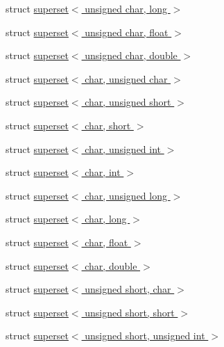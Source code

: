 \begin{DoxyCompactItemize}
\item 
struct \hyperlink{structcimg__library_1_1cimg_1_1superset_3_01unsigned_01char_00_01long_01_4}{superset$<$ unsigned char, long $>$}
\item 
struct \hyperlink{structcimg__library_1_1cimg_1_1superset_3_01unsigned_01char_00_01float_01_4}{superset$<$ unsigned char, float $>$}
\item 
struct \hyperlink{structcimg__library_1_1cimg_1_1superset_3_01unsigned_01char_00_01double_01_4}{superset$<$ unsigned char, double $>$}
\item 
struct \hyperlink{structcimg__library_1_1cimg_1_1superset_3_01char_00_01unsigned_01char_01_4}{superset$<$ char, unsigned char $>$}
\item 
struct \hyperlink{structcimg__library_1_1cimg_1_1superset_3_01char_00_01unsigned_01short_01_4}{superset$<$ char, unsigned short $>$}
\item 
struct \hyperlink{structcimg__library_1_1cimg_1_1superset_3_01char_00_01short_01_4}{superset$<$ char, short $>$}
\item 
struct \hyperlink{structcimg__library_1_1cimg_1_1superset_3_01char_00_01unsigned_01int_01_4}{superset$<$ char, unsigned int $>$}
\item 
struct \hyperlink{structcimg__library_1_1cimg_1_1superset_3_01char_00_01int_01_4}{superset$<$ char, int $>$}
\item 
struct \hyperlink{structcimg__library_1_1cimg_1_1superset_3_01char_00_01unsigned_01long_01_4}{superset$<$ char, unsigned long $>$}
\item 
struct \hyperlink{structcimg__library_1_1cimg_1_1superset_3_01char_00_01long_01_4}{superset$<$ char, long $>$}
\item 
struct \hyperlink{structcimg__library_1_1cimg_1_1superset_3_01char_00_01float_01_4}{superset$<$ char, float $>$}
\item 
struct \hyperlink{structcimg__library_1_1cimg_1_1superset_3_01char_00_01double_01_4}{superset$<$ char, double $>$}
\item 
struct \hyperlink{structcimg__library_1_1cimg_1_1superset_3_01unsigned_01short_00_01char_01_4}{superset$<$ unsigned short, char $>$}
\item 
struct \hyperlink{structcimg__library_1_1cimg_1_1superset_3_01unsigned_01short_00_01short_01_4}{superset$<$ unsigned short, short $>$}
\item 
struct \hyperlink{structcimg__library_1_1cimg_1_1superset_3_01unsigned_01short_00_01unsigned_01int_01_4}{superset$<$ unsigned short, unsigned int $>$}

\end{DoxyCompactItemize}
